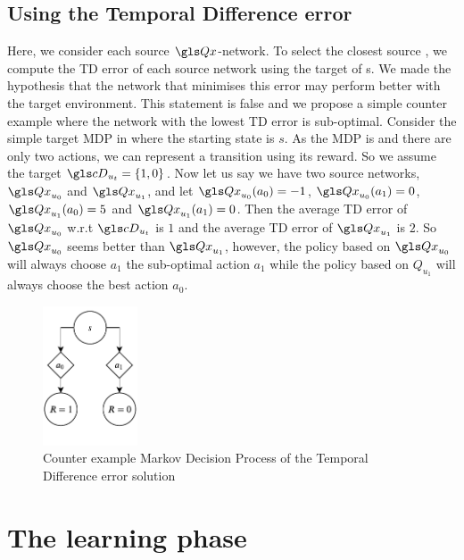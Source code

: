 \subsection{Using the Temporal Difference error}

Here, we consider each source  $\Q$-network. To select the closest source , we compute the \gls{TD} error of each source  network using the target  of s. We made the hypothesis that the network that minimises this error may perform better with the target environment. This statement is false and we propose a simple counter example where the network with the lowest \gls{TD} error is sub-optimal. Consider the simple target \gls{MDP} in  where the starting state is $s$. As the \gls{MDP} is  and there are only two actions, we can represent a transition using its reward. So we assume the target  $\cD_{u_t} = \{1,0\}$. Now let us say we have two source networks, $\Q_{u_0}$ and $\Q_{u_1}$, and let $\Q_{u_0}(a_0) = -1$, $\Q_{u_0}(a_1) = 0$, $\Q_{u_1}(a_0) = 5$ and $\Q_{u_1}(a_1) = 0$. Then the average \gls{TD} error of $\Q_{u_0}$ w.r.t $\cD_{u_t}$ is $1$ and the average \gls{TD} error of $\Q_{u_1}$ is $2$. So $\Q_{u_0}$ seems better than $\Q_{u_1}$, however, the policy based on $\Q_{u_0}$ will always choose $a_1$ the sub-optimal action $a_1$ while the policy based on $Q_{u_1}$ will always choose the best action $a_0$.

\begin{figure}
    \begin{center}
        \includegraphics[width=0.25\textwidth,page=1]{sources/conclusion/mdp}
    \end{center}
    \caption[Counter example for the Temporal Difference error solution]{Counter example Markov Decision Process of the Temporal Difference error solution}
    \label{fig:counter-exemple-td}
\end{figure}

\section{The learning phase}

